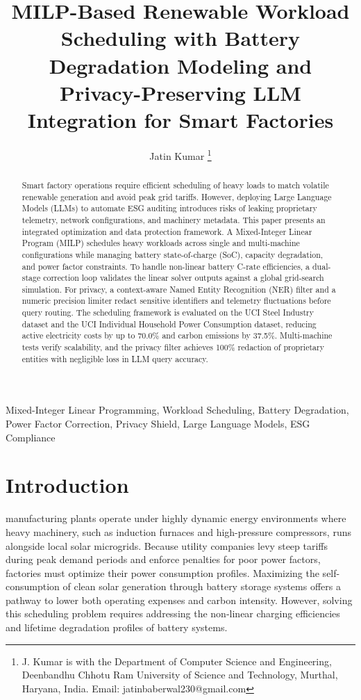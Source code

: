 \documentclass[journal]{IEEEtran}
\begin{document}
\title{MILP-Based Renewable Workload Scheduling with Battery Degradation Modeling and Privacy-Preserving LLM Integration for Smart Factories}
\author{Jatin Kumar%
\thanks{J. Kumar is with the Department of Computer Science and Engineering, Deenbandhu Chhotu Ram University of Science and Technology, Murthal, Haryana, India. Email: jatinbaberwal230@gmail.com}}

\maketitle

\begin{abstract}
Smart factory operations require efficient scheduling of heavy loads to match volatile renewable generation and avoid peak grid tariffs. However, deploying Large Language Models (LLMs) to automate ESG auditing introduces risks of leaking proprietary telemetry, network configurations, and machinery metadata. This paper presents an integrated optimization and data protection framework. A Mixed-Integer Linear Program (MILP) schedules heavy workloads across single and multi-machine configurations while managing battery state-of-charge (SoC), capacity degradation, and power factor constraints. To handle non-linear battery C-rate efficiencies, a dual-stage correction loop validates the linear solver outputs against a global grid-search simulation. For privacy, a context-aware Named Entity Recognition (NER) filter and a numeric precision limiter redact sensitive identifiers and telemetry fluctuations before query routing. The scheduling framework is evaluated on the UCI Steel Industry dataset and the UCI Individual Household Power Consumption dataset, reducing active electricity costs by up to 70.0\% and carbon emissions by 37.5\%. Multi-machine tests verify scalability, and the privacy filter achieves 100\% redaction of proprietary entities with negligible loss in LLM query accuracy.
\end{abstract}

\begin{IEEEkeywords}
Mixed-Integer Linear Programming, Workload Scheduling, Battery Degradation, Power Factor Correction, Privacy Shield, Large Language Models, ESG Compliance
\end{IEEEkeywords}

\section{Introduction}
 manufacturing plants operate under highly dynamic energy environments where heavy machinery, such as induction furnaces and high-pressure compressors, runs alongside local solar microgrids. Because utility companies levy steep tariffs during peak demand periods and enforce penalties for poor power factors, factories must optimize their power consumption profiles. Maximizing the self-consumption of clean solar generation through battery storage systems offers a pathway to lower both operating expenses and carbon intensity. However, solving this scheduling problem requires addressing the non-linear charging efficiencies and lifetime degradation profiles of battery systems.
\end{document}
